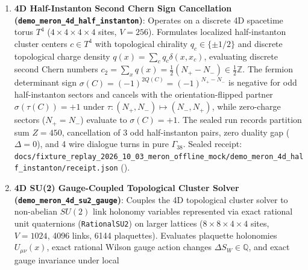 \documentclass[
  11pt,
]{article}
\begin{document}
\begin{enumerate}
  recorded 24/24 wire, opcode, and exact-match rates are that mock
  scorer. Its latencies are the constants 850 ms, 350 ms, and 120 ms.
  These figures are not an OpenRouter measurement. A live invocation of
  this scenario is refused. Sealed receipt:
  \texttt{docs/\allowbreak{}fixture\_replay\_2026\_10\_03\_meron\_offline\_mock/\allowbreak{}demo\_\allowbreak{}meron\_\allowbreak{}2d\_\allowbreak{}benchmark/\allowbreak{}receipt.json}
  (\texttt{}).
\item
  \textbf{4D Half-Instanton Second Chern Sign Cancellation
  (\texttt{demo\_\allowbreak{}meron\_\allowbreak{}4d\_\allowbreak{}half\_\allowbreak{}instanton})}:
  Operates on a discrete 4D spacetime torus \(T^4\)
  (\(4 \times 4 \times 4 \times 4\) sites, \(V = 256\)). Formulates
  localized half-instanton cluster centers \(c \in T^4\) with
  topological chirality \(q_c \in \{\pm 1/2\}\) and discrete topological
  charge density \(q(x) = \sum_c q_c \delta(x, x_c)\), evaluating
  discrete second Chern numbers
  \(c_2 = \sum_x q(x) = \frac{1}{2}(N_+ - N_-) \in \frac{1}{2}\mathbb{Z}\).
  The fermion determinant sign
  \(\sigma(C) = (-1)^{2 Q(C)} = (-1)^{N_+ - N_-}\) is negative for odd
  half-instanton sectors and cancels with the orientation-flipped
  partner \(\sigma(\tau(C)) = +1\) under
  \(\tau: (N_+, N_-) \mapsto (N_-, N_+)\), while zero-charge sectors
  (\(N_+ = N_-\)) evaluate to \(\sigma(C) = +1\). The sealed run records
  partition sum \(Z = 450\), cancellation of 3 odd half-instanton pairs,
  zero duality gap (\(\Delta = 0\)), and 4 wire dialogue turns in pure
  \(\Gamma_{38}\). Sealed receipt:
  \texttt{docs/\allowbreak{}fixture\_replay\_2026\_10\_03\_meron\_offline\_mock/\allowbreak{}demo\_\allowbreak{}meron\_\allowbreak{}4d\_\allowbreak{}half\_\allowbreak{}instanton/\allowbreak{}receipt.json}
  (\texttt{}).
\item
  \textbf{4D SU(2) Gauge-Coupled Topological Cluster Solver
  (\texttt{demo\_\allowbreak{}meron\_\allowbreak{}4d\_\allowbreak{}su2\_\allowbreak{}gauge})}:
  Couples the 4D topological cluster solver to non-abelian \(SU(2)\) link
  holonomy variables represented via exact rational unit quaternions
  (\texttt{RationalSU2}) on larger lattices (\(8 \times 8 \times 4 \times 4\)
  sites, \(V = 1024\), 4096 links, 6144 plaquettes). Evaluates plaquette
  holonomies \(U_{\mu\nu}(x)\), exact rational Wilson gauge action changes
  \(\Delta S_W \in \mathbb{Q}\), and exact gauge invariance under local

\end{enumerate}
\end{document}
